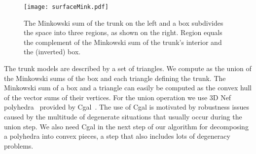 \documentclass{article}
\newcommand\ignore[1]{}
\newcounter{algo}
\newcommand{\cgal}{{\sc Cgal}}
\begin{document}
\begin{figure}[t]
\center
\texttt{[image: surfaceMink.pdf]}
\caption{\label{fig:surfaceMink} The Minkowski sum of the trunk on the
left and a box subdivides the space into three regions, as shown on
the right. Region  equals the complement of the Minkowski sum of
the trunk's interior and the (inverted) box.}
\end{figure}

The trunk models are described by a set of triangles. We compute 
as the union of the Minkowski sums of the box and each triangle
defining the trunk. The Minkowski sum of a box and a triangle can
easily be computed as the convex hull of the vector sums of their
vertices.  For the union operation we use 3D Nef
polyhedra~\cite{hkm-bosnc-07} provided by {\cgal}~\cite{cgalhome}. The
use of {\cgal} is motivated by robustness issues caused by the
multitude of degenerate situations that usually occur during the union
step. We also need {\cgal} in the next step of our algorithm for
decomposing a polyhedra into convex pieces, a step that also includes
lots of degeneracy problems.

\ignore{
At this point, we need to make sure that the polyhedron  that
results from the union of the Minkowski sums indeed subdivides the
three-dimensional space into three regions as described above, and we
need to extract the region  from this subdivision. Two properties
of the trunk's surface may cause that  does not induce the desired
subdivision. First, the surface may have holes that are so large that
they also occur in . Then  and  form a single region and we
cannot extract . Second, the trunk model may contain additional
parts apart from the surface around the trunk's volume, as can be seen
in the model shown in Figure~\ref{fig:csp}. The union of the Minkowski
sums of these additional parts may enclose an additional volume as
illustrated by Figure~\ref{fig:anotherCell}. Then we need to
distinguish the free space from these additional volumes. This
situation is especially hard to resolve, if both problems occur at the
same time. Fortunately, the trunk models are good-natured. All models
that experimented with, did not require any special treatment.

\begin{figure}[t]
\center
\texttt{[image: trunk+.pdf]}
\caption{
\label{fig:anotherCell}
The Minkowski sum  of a box and a trunk with additional parts
on its outside might cause a subdivision into more than three region. Which
of the two regions enclosed by  is the Minkowski sum of the box and the
trunk's interior?}
\end{figure}
}
\end{document}
